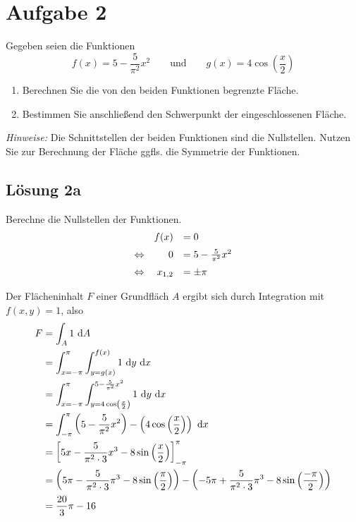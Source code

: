 \documentclass[main.tex]{subfiles}
\begin{document}
\section{Aufgabe 2}
Gegeben seien die Funktionen 
\[
    f(x) = 5 - \frac{5}{\pi^2} x^2 
    \qquad \mbox{und} \qquad 
    g(x) = 4 \cos \left( \frac{x}{2} \right)
\]
\begin{enumerate}
\item Berechnen Sie die von den beiden Funktionen begrenzte Fläche.
\item Bestimmen Sie anschließend den Schwerpunkt der eingeschlossenen Fläche.
\end{enumerate}
\textit{Hinweise:} Die Schnittstellen der beiden Funktionen sind die Nullstellen. Nutzen Sie zur Berechnung der Fläche ggfls. die Symmetrie der Funktionen. 

\subsection{Lösung 2a}

Berechne die Nullstellen der Funktionen.
\begin{equation*}
    \begin{array}[pos]{lrl}
                         & f(x)    &= 0\\[2mm]
        \Leftrightarrow  & 0       &= 5 - \frac{5}{\pi^2} x^2 \\[2mm]
        \Leftrightarrow  & x_{1,2} &= \pm \pi \\
    \end{array}
\end{equation*}


Der Flächeninhalt $F$ einer Grundfläch $A$ ergibt sich durch Integration mit $f(x,y) = 1$, also
\begin{align*}
    F &= \int_{A} 1 ~\mathrm{d}A\\
      &= \int_{x=-\pi}^{\pi} \int_{y=g(x)}^{f(x)} 1 ~\mathrm{d}y ~\mathrm{d}x \\
      &= \int_{x=-\pi}^{\pi} \int_{y=4 \cos \left( \frac{x}{2} \right)}^{5 - \frac{5}{\pi^2} x^2} 1 ~\mathrm{d}y ~\mathrm{d}x \\
      &= \int_{-\pi}^{\pi} \left(5 - \frac{5}{\pi^2} x^2\right) - \left(4 \cos \left(\frac{x}{2} \right)\right) ~\mathrm{d}x \\
      &= \left[5x - \frac{5}{\pi^2\cdot 3} x^3 - 8 \sin \left(\frac{x}{2} \right)\right]_{-\pi}^{\pi} \\
      &= \left(5\pi - \frac{5}{\pi^2\cdot 3} \pi^3 - 8 \sin \left(\frac{\pi}{2} \right)\right) - \left(-5\pi + \frac{5}{\pi^2\cdot 3} \pi^3 - 8 \sin \left(\frac{-\pi}{2} \right)\right) \\
      &= \frac{20}{3} \pi - 16 \\
\end{align*}
\end{document}
